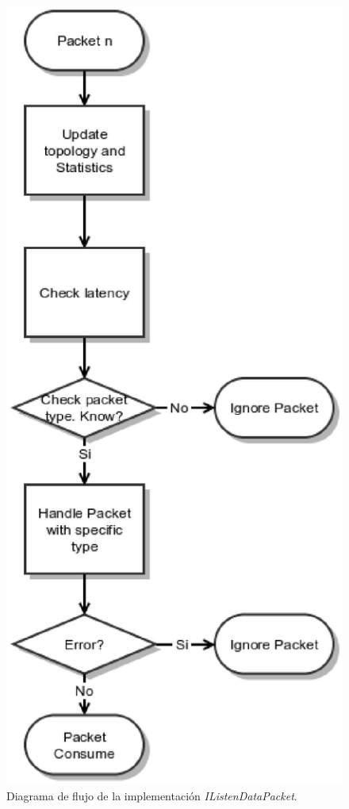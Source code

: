 \documentclass[a4paper,11pt]{book}
\begin{document}
\begin{figure}[tb]
\centering
\includegraphics[scale=0.55]{./figuras/listenFlow}
\caption{Diagrama de flujo de la implementación \textit{IListenDataPacket}.}\label{listenFlow}
\end{figure}
\end{document}
